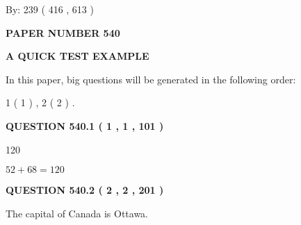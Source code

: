 \documentclass[12pt]{article}
\begin{document}
   
\hspace{1.0in} By: 
 239 ( 416 ,  613 )
   
   
   
   
\newpage 
\setcounter{page}{ 
   540001 } 
   
   
   
   
 {\textbf{ \Large{ PAPER NUMBER  540  }}}
   
   
\vspace{0.2in}
   
   
   
   
   
   
 \vspace{0.2in}
{\LARGE {\textbf{ A QUICK TEST EXAMPLE}}}
   
   
   
\vspace{0.2in}
   
In this paper, big questions will be generated in the following order: 
   
   
   1 ( 1 )
 ,
   2 ( 2 )
 .
  
\vspace{0.2in}
  
{\textbf{\Large{QUESTION
540.1 
 ( 1 , 1 , 101 )
}}}
  
  
 
 
\noindent{}

120
 
 
 
 
\noindent{}

$ %
52 +  %
68=   %
120$
 
 
  
\vspace{0.2in}
  
{\textbf{\Large{QUESTION
540.2 
 ( 2 , 2 , 201 )
}}}
  
  
 
 
\noindent{}
 
 
The capital of Canada is Ottawa.
 
 
 
 
   
   
 \vspace{0.2in}
 
\end{document}
